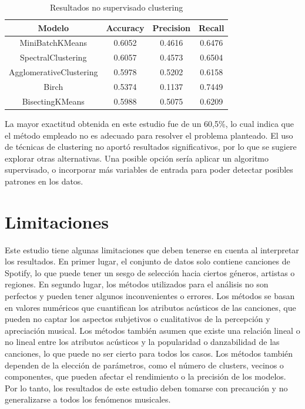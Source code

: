 \documentclass{wsdcr}
\begin{document}
\vspace{5mm}
\begin{table}[H]
    \begin{center}
        \begin{tabular}{| c | c | c | c | }\hline
            Modelo                  & Accuracy & Precision & Recall \\ \hline
            MiniBatchKMeans         & 0.6052   & 0.4616    & 0.6476 \\
            SpectralClustering      & 0.6057   & 0.4573    & 0.6504 \\
            AgglomerativeClustering & 0.5978   & 0.5202    & 0.6158 \\
            Birch                   & 0.5374   & 0.1137    & 0.7449 \\
            BisectingKMeans         & 0.5988   & 0.5075    & 0.6209 \\
            \hline
        \end{tabular}
        \caption{Resultados no supervisado clustering}
        \label{tab:resultados no supervisado clustering}
    \end{center}
\end{table}
La mayor exactitud obtenida en este estudio fue de un 60,5\%, lo cual indica que el método empleado no es adecuado para resolver el problema planteado. El uso de técnicas de clustering no aportó resultados significativos, por lo que se sugiere explorar otras alternativas. Una posible opción sería aplicar un algoritmo supervisado, o incorporar más variables de entrada para poder detectar posibles patrones en los datos.

\section{Limitaciones}

Este estudio tiene algunas limitaciones que deben tenerse en cuenta al interpretar los resultados. En primer lugar, el conjunto de datos solo contiene canciones de Spotify, lo que puede tener un sesgo de selección hacia ciertos géneros, artistas o regiones. En segundo lugar, los métodos utilizados para el análisis no son perfectos y pueden tener algunos inconvenientes o errores. Los métodos se basan en valores numéricos que cuantifican los atributos acústicos de las canciones, que pueden no captar los aspectos subjetivos o cualitativos de la percepción y apreciación musical. Los métodos también asumen que existe una relación lineal o no lineal entre los atributos acústicos y la popularidad o danzabilidad de las canciones, lo que puede no ser cierto para todos los casos. Los métodos también dependen de la elección de parámetros, como el número de clusters, vecinos o componentes, que pueden afectar el rendimiento o la precisión de los modelos. Por lo tanto, los resultados de este estudio deben tomarse con precaución y no generalizarse a todos los fenómenos musicales.
\end{document}
